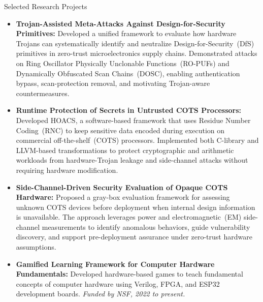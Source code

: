 \begin{rSection}{Selected Research Projects}
\begin{itemize}

    \item \textbf{Trojan-Assisted Meta-Attacks Against Design-for-Security Primitives:} Developed a unified framework to evaluate how hardware Trojans can systematically identify and neutralize Design-for-Security~(DfS) primitives in zero-trust microelectronics supply chains. Demonstrated attacks on Ring Oscillator Physically Unclonable Functions~(RO-PUFs) and Dynamically Obfuscated Scan Chains~(DOSC), enabling authentication bypass, scan-protection removal, and motivating Trojan-aware countermeasures.
    \item \textbf{Runtime Protection of Secrets in Untrusted COTS Processors:} Developed HOACS, a software-based framework that uses Residue Number Coding~(RNC) to keep sensitive data encoded during execution on commercial off-the-shelf~(COTS) processors. Implemented both C-library and LLVM-based transformations to protect cryptographic and arithmetic workloads from hardware-Trojan leakage and side-channel attacks without requiring hardware modification.
    \item \textbf{Side-Channel-Driven Security Evaluation of Opaque COTS Hardware:} Proposed a gray-box evaluation framework for assessing unknown COTS devices before deployment when internal design information is unavailable. The approach leverages power and electromagnetic~(EM) side-channel measurements to identify anomalous behaviors, guide vulnerability discovery, and support pre-deployment assurance under zero-trust hardware assumptions.
    \item \textbf{Gamified Learning Framework for Computer Hardware Fundamentals: } Developed hardware-based games to teach fundamental concepts of computer hardware using Verilog, FPGA, and ESP32 development boards.\textit{ Funded by NSF, 2022 to present.}
\end{itemize}
\end{rSection} 


